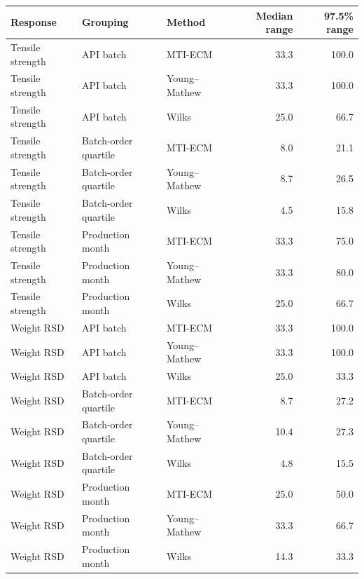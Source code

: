 \begin{tabular}{@{}lllrr@{}}
\toprule
Response & Grouping & Method & Median range & 97.5\% range\\
\midrule
Tensile strength & API batch & MTI-ECM & 33.3 & 100.0 \\
Tensile strength & API batch & Young--Mathew & 33.3 & 100.0 \\
Tensile strength & API batch & Wilks & 25.0 & 66.7 \\
Tensile strength & Batch-order quartile & MTI-ECM & 8.0 & 21.1 \\
Tensile strength & Batch-order quartile & Young--Mathew & 8.7 & 26.5 \\
Tensile strength & Batch-order quartile & Wilks & 4.5 & 15.8 \\
Tensile strength & Production month & MTI-ECM & 33.3 & 75.0 \\
Tensile strength & Production month & Young--Mathew & 33.3 & 80.0 \\
Tensile strength & Production month & Wilks & 25.0 & 66.7 \\
Weight RSD & API batch & MTI-ECM & 33.3 & 100.0 \\
Weight RSD & API batch & Young--Mathew & 33.3 & 100.0 \\
Weight RSD & API batch & Wilks & 25.0 & 33.3 \\
Weight RSD & Batch-order quartile & MTI-ECM & 8.7 & 27.2 \\
Weight RSD & Batch-order quartile & Young--Mathew & 10.4 & 27.3 \\
Weight RSD & Batch-order quartile & Wilks & 4.8 & 15.5 \\
Weight RSD & Production month & MTI-ECM & 25.0 & 50.0 \\
Weight RSD & Production month & Young--Mathew & 33.3 & 66.7 \\
Weight RSD & Production month & Wilks & 14.3 & 33.3 \\
\bottomrule
\end{tabular}
